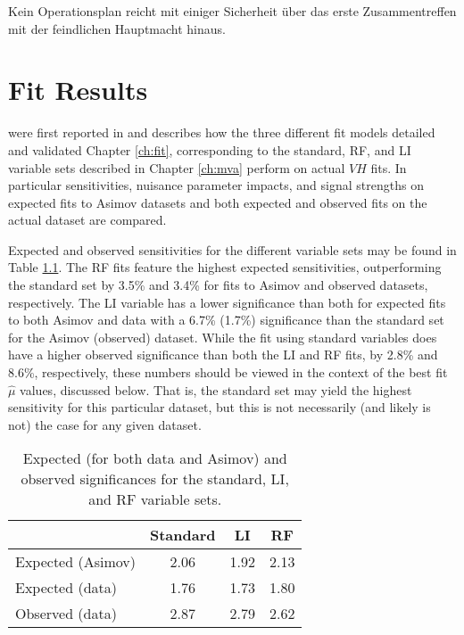 \begin{savequote}[75mm]
Kein Operationsplan reicht mit einiger Sicherheit \"uber das erste Zusammentreffen mit der feindlichen Hauptmacht hinaus.
\end{savequote}

\chapter{Fit Results}

 were first reported in \cite{rflinote} and describes how the three different fit models detailed and validated Chapter \ref{ch:fit}, corresponding to the standard, RF, and LI variable sets described in Chapter \ref{ch:mva} perform on actual $VH$ fits.  In particular sensitivities, nuisance parameter impacts, and signal strengths on expected fits to Asimov datasets and both expected and observed fits on the actual \lumi dataset are compared.

  Expected and observed sensitivities for the different variable sets may be found in Table \ref{tab:Sensitivities}.  The RF fits feature the highest expected sensitivities, outperforming the standard set by 3.5\% and 3.4\% for fits to Asimov and observed datasets, respectively.  The LI variable has a lower significance than both for expected fits to both Asimov and data with a 6.7\% (1.7\%) significance than the standard set for the Asimov (observed) dataset.  While the fit using standard variables does have a higher observed significance than both the LI and RF fits, by 2.8\% and 8.6\%, respectively, these numbers should be viewed in the context of the best fit $\hat{\mu}$ values, discussed below.  That is, the standard set may yield the highest sensitivity for this particular dataset, but this is not necessarily (and likely is not) the case for any given dataset.

\begin{table}[!htbp]
\begin{center}
\begin{tabular}{lccc}
\hline\hline
 & Standard &LI &RF\\
\hline
Expected (Asimov) & 2.06 & 1.92 & 2.13\\
\hline
Expected (data) & 1.76 & 1.73 & 1.80\\
\hline
Observed (data) & 2.87 & 2.79 & 2.62\\
\hline
\hline
\end{tabular}
\end{center}
\caption{Expected (for both data and Asimov) and observed significances for the standard, LI, and RF variable sets.}
\label{tab:Sensitivities}
\end{table}

